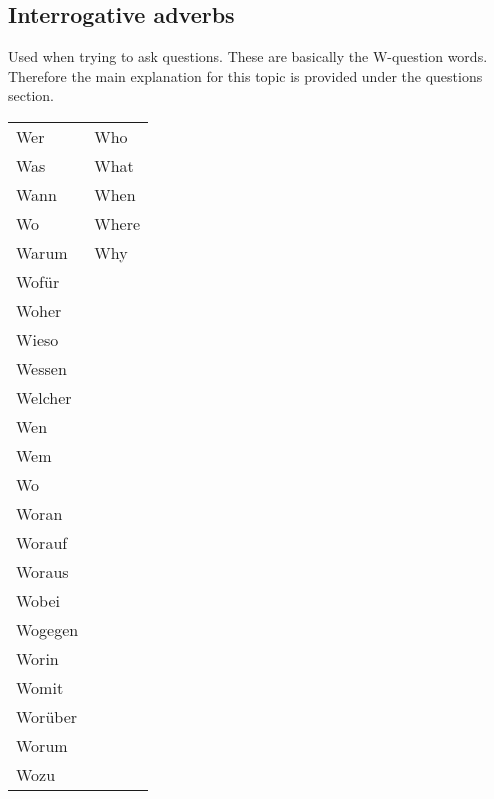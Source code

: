 \documentclass[a4paper,twocolumn,10pt]{article}
\newcommand{\subsectionend}
{
\nolinenumbers
\linenumbers
}
\newcommand{\tabularxtable}[3]
{

	\vspace{0.5cm}
	\nolinenumbers

	\begin{tabularx}{#1}{#2}
		#3
	\end{tabularx}

	\linenumbers
	\vspace{0.5cm}
}
\begin{document}

\subsectionend

\subsection{Interrogative adverbs}
\label{ssec:interrogative_adverbs}

Used when trying to ask questions. These are basically the W-question words.
Therefore the main explanation for this topic is provided under the questions
section.



\tabularxtable
{0.95\linewidth}
{lX}
{
\rowcolor{white}     Wer   & Who\\
\rowcolor{lightgray} Was   & What\\
\rowcolor{white}     Wann  & When\\
\rowcolor{lightgray} Wo    & Where\\
\rowcolor{white}     Warum & Why\\


\rowcolor{lightgray} Wofür   & \\
\rowcolor{white}     Woher &  \\
\rowcolor{lightgray} Wieso &  \\
\rowcolor{white}     Wessen &  \\
\rowcolor{lightgray} Welcher &  \\
\rowcolor{white}     Wen &  \\
\rowcolor{lightgray} Wem &  \\

\rowcolor{white}     Wo &  \\
\rowcolor{lightgray} Woran &  \\
\rowcolor{white}     Worauf &  \\
\rowcolor{lightgray} Woraus &  \\
\rowcolor{white}     Wobei &  \\
\rowcolor{lightgray} Wogegen &  \\
\rowcolor{white}     Worin &  \\
\rowcolor{lightgray} Womit &  \\
\rowcolor{white}     Worüber &  \\
\rowcolor{lightgray} Worum &  \\
\rowcolor{white}     Wozu &  \\


}
\end{document}
